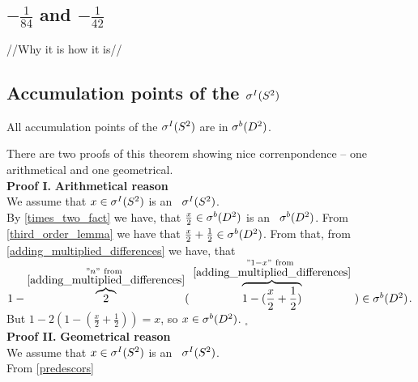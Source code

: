\subsection{$-\frac{1}{84}$ and $-\frac{1}{42}$}
//Why it is how it is//
\subsection{Accumulation points of the ${\mathcal{\sigma}^I(S^2)}$}
\begin{theorem}
All accumulation points of the ${\mathcal{\sigma}^I(S^2)}$ are in ${\mathcal{\sigma}^b(D^2)}$.
\end{theorem}
There are two proofs of this theorem showing nice correnpondence -- one arithmetical and 
one geometrical. 
\\
\textbf{Proof I.}
\textbf{Arithmetical reason} \\
We assume that $x \in {\mathcal{\sigma}^I(S^2)}$ is an \apots\ ${\mathcal{\sigma}^I(S^2)}$.\\
By \ref{times_two_fact} we have, that 
$\frac{x}{2} \in {\mathcal{\sigma}^b(D^2)}$ is an \apots\ ${\mathcal{\sigma}^b(D^2)}$. From \ref{third_order_lemma} we have that 
$\frac{x}{2} + \frac{1}{2} \in {\mathcal{\sigma}^b(D^2)}$. From that, from \ref{adding_multiplied_differences} we have, 
that $1-\overbrace{2}^{\substack{"n"\rm\ from\ \\ 
\rm \ref{adding_multiplied_differences}}} 
(\ \overbrace{1-(\frac{x}{2}+\frac{1}{2})}^{\substack{"1-x"\rm\ 
from\ \\ \rm \ref{adding_multiplied_differences}}}\ ) \in \sbD$. But $1 - 2(1-(\frac{x}{2}+
\frac{1}{2})) = x$, so $x \in {\mathcal{\sigma}^b(D^2)}$. $_\square$
\\
\textbf{Proof II.}
\textbf{Geometrical reason} \\
We assume that $x \in {\mathcal{\sigma}^I(S^2)}$ is an \apots\ ${\mathcal{\sigma}^I(S^2)}$.\\
From \ref{predescors}  



